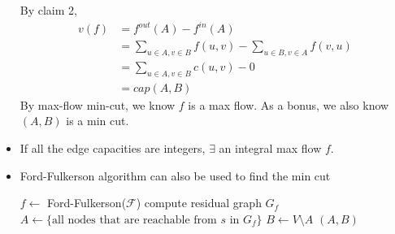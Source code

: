 \documentclass[a4paper,12pt]{article}
\begin{document}
\begin{itemize}
\begin{itemize}
    \end{itemize}
    By claim 2, \begin{align}
        v(f)&=f^{out}(A)-f^{in}(A)\\
        &=\sum_{u\in A,v\in B}f(u,v)-\sum_{u\in B,v\in A}f(v,u)\\
        &=\sum_{u\in A,v\in B}c(u,v)-0\\
        &=cap(A,B)
    \end{align}
    By max-flow min-cut, we know $f$ is a max flow. As a bonus, we also know $(A,B)$ is a min cut.
    \item {} If all the edge capacities are integers, $\exists$ an integral max flow $f$.
    \item Ford-Fulkerson algorithm can also be used to find the min cut
    \begin{algorithmic}[1]
            \State $f\gets$ Ford-Fulkerson($\mathcal F$)
            \State compute residual graph $G_f$
            \State $A\gets\{\text{all nodes that are reachable from $s$ in $G_f$}\}$
            \State $B\gets V\setminus A$
            \State \Return $(A,B)$
        \EndProcedure
    \end{algorithmic}
\end{itemize}
\end{document}
